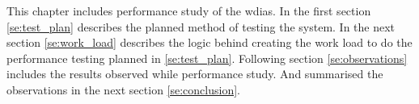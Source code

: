 
This chapter includes performance study of the \acrshort{wdias}. In the first section \ref{se:test_plan} describes the planned method of testing the system.
In the next section \ref{se:work_load} describes the logic behind creating the work load to do the performance testing planned in \ref{se:test_plan}.
Following section \ref{se:observations} includes the results observed while performance study. And summarised the observations in the next section \ref{se:conclusion}.

